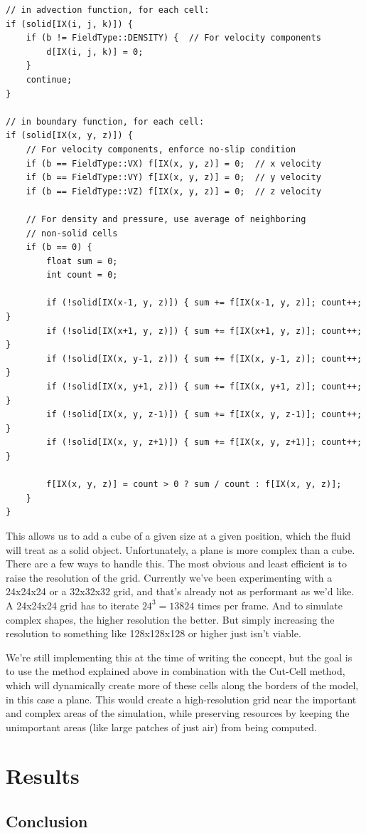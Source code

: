 \documentclass[a4paper,12pt]{article}
\begin{document}
\begin{lstlisting}
// in advection function, for each cell:
if (solid[IX(i, j, k)]) {
	if (b != FieldType::DENSITY) {  // For velocity components
		d[IX(i, j, k)] = 0;
	}
	continue;
}

// in boundary function, for each cell:
if (solid[IX(x, y, z)]) {
	// For velocity components, enforce no-slip condition
	if (b == FieldType::VX) f[IX(x, y, z)] = 0;  // x velocity
	if (b == FieldType::VY) f[IX(x, y, z)] = 0;  // y velocity
	if (b == FieldType::VZ) f[IX(x, y, z)] = 0;  // z velocity

	// For density and pressure, use average of neighboring
	// non-solid cells
	if (b == 0) {
		float sum = 0;
		int count = 0;

		if (!solid[IX(x-1, y, z)]) { sum += f[IX(x-1, y, z)]; count++; }
		if (!solid[IX(x+1, y, z)]) { sum += f[IX(x+1, y, z)]; count++; }
		if (!solid[IX(x, y-1, z)]) { sum += f[IX(x, y-1, z)]; count++; }
		if (!solid[IX(x, y+1, z)]) { sum += f[IX(x, y+1, z)]; count++; }
		if (!solid[IX(x, y, z-1)]) { sum += f[IX(x, y, z-1)]; count++; }
		if (!solid[IX(x, y, z+1)]) { sum += f[IX(x, y, z+1)]; count++; }

		f[IX(x, y, z)] = count > 0 ? sum / count : f[IX(x, y, z)];
	}
}
\end{lstlisting}

This allows us to add a cube of a given size at a given position, which the
fluid will treat as a solid object. Unfortunately, a plane is more complex than
a cube. There are a few ways to handle this. The most obvious and least efficient
is to raise the resolution of the grid. Currently we've been experimenting with a
24x24x24 or a 32x32x32 grid, and that's already not as performant as we'd like.
A 24x24x24 grid has to iterate $24^3 = 13824$ times per frame. And to simulate
complex shapes, the higher resolution the better. But simply increasing the
resolution to something like 128x128x128 or higher just isn't viable.

We're still implementing this at the time of writing the concept, but the goal
is to use the method explained above in combination with the Cut-Cell method,
which will dynamically create more of these cells along the borders of the model,
in this case a plane. This would create a high-resolution grid near the important
and complex areas of the simulation, while preserving resources by keeping the
unimportant areas (like large patches of just air) from being computed.

\section{Results}
\ipsum[1]

\subsection{Conclusion}
\ipsum[1]

\nocite{*}
\printbibliography
\end{document}
